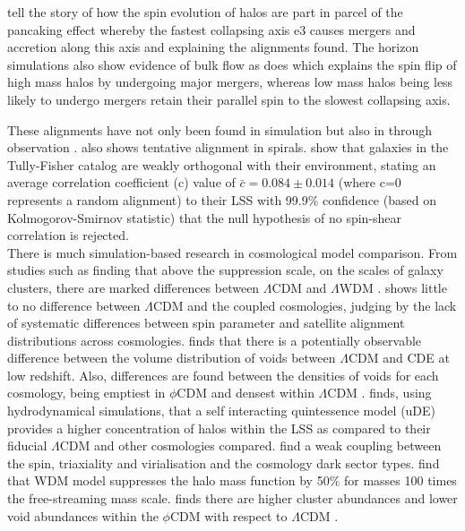 \documentclass[a4paper,fleqn,usenatbib]{mnras}
\def \lcdm{$\Lambda$CDM }
\def \lwdm{$\Lambda$WDM }
\def \qcdm{$\phi$CDM }
\begin{document}
\citet{Bond_96,Codis_12,Pichon_16} tell the story of how the spin evolution of halos are part in parcel of the pancaking effect whereby the fastest collapsing axis e3 causes mergers and accretion along this axis and explaining the alignments found. The horizon simulations \citep{Dubois_14,Welker_14} also show evidence of bulk flow as does \citet{Trowland_13} which explains the spin flip of high mass halos by undergoing major mergers, whereas low mass halos being less likely to undergo mergers retain their parallel spin to the slowest collapsing axis.

These alignments have not only been found in simulation but also in through observation \citep{Jones_10}. \citet{Pen_00} also shows tentative alignment in spirals. 
\citet{Lee_Erdogdu_07} show that galaxies in the Tully-Fisher catalog are weakly orthogonal with their environment, stating an average correlation coefficient (c) value of $\bar{c}=0.084\pm 0.014$ (where c=0 represents a random alignment) to their LSS with 99.9$\%$ confidence (based on Kolmogorov-Smirnov statistic) that the null hypothesis of no spin-shear correlation is rejected.
\\
There is much simulation-based research in cosmological model comparison. From studies such as \citet{Elahi_14} finding that above the suppression scale, on the scales of galaxy clusters, there are marked differences between \lcdm and \lwdm. \citet{Elahi_15} shows little to no difference between \lcdm and the coupled cosmologies, judging by the lack of systematic differences between spin parameter and satellite alignment distributions across cosmologies. \citet{Adermann_18} finds that there is a potentially observable difference between the volume distribution of voids between \lcdm and CDE at low redshift. Also, differences are found between the densities of voids for each cosmology, being emptiest in \qcdm and densest within \lcdm. \citet{Carlesi_14a} finds, using hydrodynamical simulations, that a self interacting quintessence model (uDE) provides a higher concentration of halos within the LSS as compared to their fiducial \lcdm and other cosmologies compared. \citet{Carlesi_14b} find a weak coupling between the spin, triaxiality and virialisation and the cosmology dark sector types. \citet{Smith_11} find that WDM model suppresses the halo mass function by 50$\%$ for masses 100 times the free-streaming mass scale. \citet{Watts_17} finds there are higher cluster abundances and lower void abundances within the \qcdm with respect to \lcdm. 
\end{document}
